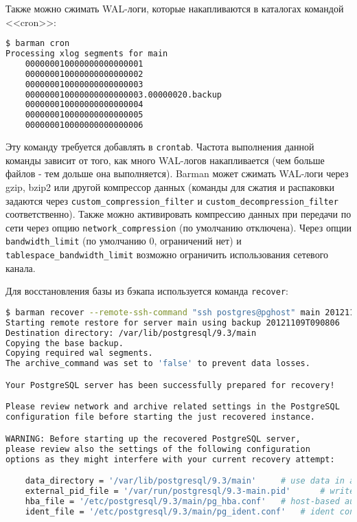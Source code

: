 Также можно сжимать WAL-логи, которые накапливаются в каталогах командой <<cron>>:

\begin{lstlisting}[language=Bash,label=lst:barman16,caption=Архивирование WAL-логов]
$ barman cron
Processing xlog segments for main
	000000010000000000000001
	000000010000000000000002
	000000010000000000000003
	000000010000000000000003.00000020.backup
	000000010000000000000004
	000000010000000000000005
	000000010000000000000006
\end{lstlisting}

Эту команду требуется добавлять в \lstinline!crontab!. Частота выполнения данной команды зависит от того, как много WAL-логов накапливается (чем больше файлов - тем дольше она выполняется). Barman может сжимать WAL-логи через gzip, bzip2 или другой компрессор данных (команды для сжатия и распаковки задаются через \lstinline!custom_compression_filter! и \lstinline!custom_decompression_filter! соответственно). Также можно активировать компрессию данных при передачи по сети через опцию \lstinline!network_compression! (по умолчанию отключена). Через опции \lstinline!bandwidth_limit! (по умолчанию 0, ограничений нет) и \lstinline!tablespace_bandwidth_limit! возможно ограничить использования сетевого канала.

Для восстановления базы из бэкапа используется команда \lstinline!recover!:

\begin{lstlisting}[language=Bash,label=lst:barman17,caption=Восстановление базы]
$ barman recover --remote-ssh-command "ssh postgres@pghost" main 20121109T090806 /var/lib/postgresql/9.3/main
Starting remote restore for server main using backup 20121109T090806
Destination directory: /var/lib/postgresql/9.3/main
Copying the base backup.
Copying required wal segments.
The archive_command was set to 'false' to prevent data losses.

Your PostgreSQL server has been successfully prepared for recovery!

Please review network and archive related settings in the PostgreSQL
configuration file before starting the just recovered instance.

WARNING: Before starting up the recovered PostgreSQL server,
please review also the settings of the following configuration
options as they might interfere with your current recovery attempt:

    data_directory = '/var/lib/postgresql/9.3/main'		# use data in another directory
    external_pid_file = '/var/run/postgresql/9.3-main.pid'		# write an extra PID file
    hba_file = '/etc/postgresql/9.3/main/pg_hba.conf'	# host-based authentication file
    ident_file = '/etc/postgresql/9.3/main/pg_ident.conf'	# ident configuration file
\end{lstlisting}

